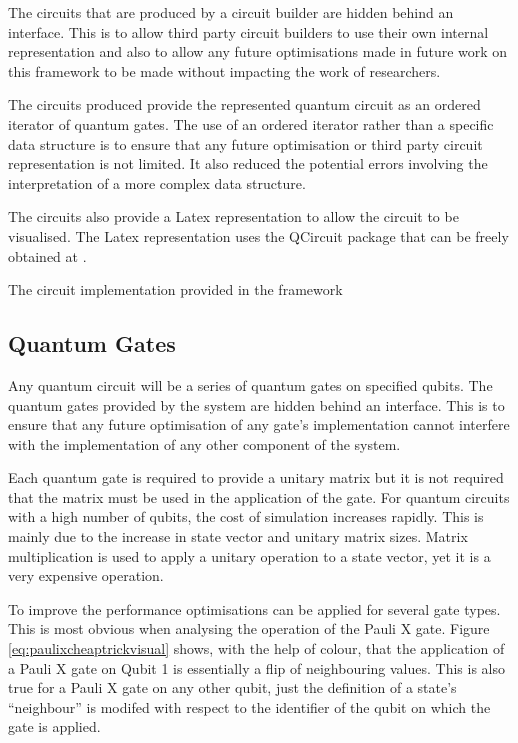 The circuits that are produced by a circuit builder are hidden behind an interface.
This is to allow third party circuit builders to use their own internal representation and also to allow any future optimisations made in future work on this framework to be made without impacting the work of researchers.

The circuits produced provide the represented quantum circuit as an ordered iterator of quantum gates.
The use of an ordered iterator rather than a specific data structure is to ensure that any future optimisation or third party circuit representation is not limited.
It also reduced the potential errors involving the interpretation of a more complex data structure.

The circuits also provide a Latex representation to allow the circuit to be visualised.
The Latex representation uses the QCircuit package that can be freely obtained at \cite{QCsite}.

The circuit implementation provided in the framework 

\subsection{Quantum Gates}
\label{sec:quantumgates}
Any quantum circuit will be a series of quantum gates on specified qubits.
The quantum gates provided by the system are hidden behind an interface.
This is to ensure that any future optimisation of any gate's implementation cannot interfere with the implementation of any other component of the system.

Each quantum gate is required to provide a unitary matrix but it is not required that the matrix must be used in the application of the gate.
For quantum circuits with a high number of qubits, the cost of simulation increases rapidly.
This is mainly due to the increase in state vector and unitary matrix sizes.
Matrix multiplication is used to apply a unitary operation to a state vector, yet it is a very expensive operation.

To improve the performance optimisations can be applied for several gate types.
This is most obvious when analysing the operation of the Pauli X gate.
Figure \ref{eq:paulixcheaptrickvisual} shows, with the help of colour, that the application of a Pauli X gate on Qubit 1 is essentially a flip of neighbouring values.
This is also true for a Pauli X gate on any other qubit, just the definition of a state's ``neighbour'' is modifed with respect to the identifier of the qubit on which the gate is applied.


